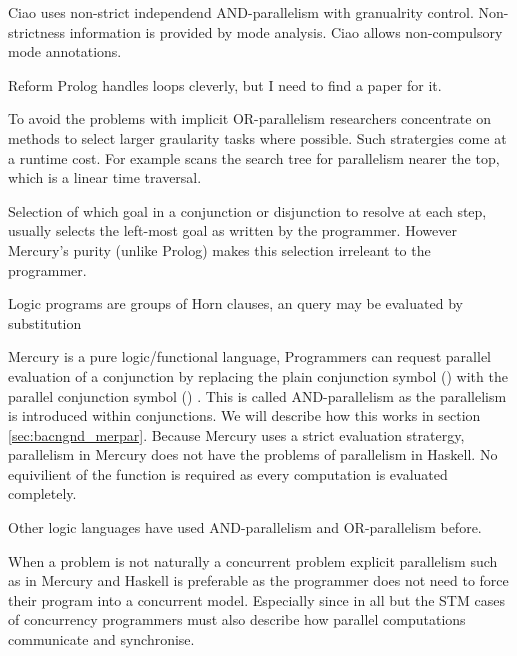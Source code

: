 Ciao uses non-strict independend AND-parallelism with granualrity control.
Non-strictness information is provided by mode analysis.
Ciao allows non-compulsory mode annotations.

Reform Prolog handles loops cleverly, but I need to find a paper for it.


To avoid the problems with implicit OR-parallelism researchers concentrate
on methods to select larger graularity tasks where possible.
Such stratergies come at a runtime cost.
For example \citet{hausman:1987:or} scans the search tree for parallelism
nearer the top, which is a linear time traversal.

Selection of which goal in a conjunction or disjunction to resolve at each
step,
usually selects the left-most goal as written by the programmer.
However Mercury's purity (unlike Prolog) makes this selection irreleant to
the programmer.


Logic programs are groups of Horn clauses,
an query may be evaluated by substitution  




\label{ref:parallel_conjunction}
Mercury is a pure logic/functional language,
Programmers can request parallel evaluation of a conjunction by replacing
the plain conjunction symbol (\samp{,})
with the parallel conjunction symbol (\samp{\&})
\citep{conway:2002:par,wang:2006:hons,wang:2011:dep-par}.
This is called AND-parallelism as the parallelism is introduced within
conjunctions.
We will describe how this works in section \ref{sec:bacngnd_merpar}.
Because Mercury uses a strict evaluation stratergy,
parallelism in Mercury does not have the problems of parallelism in Haskell.
No equivilient of the  function is required as every computation
is evaluated completely.

Other logic languages have used AND-parallelism and OR-parallelism before.


When a problem is not naturally a concurrent problem 
explicit parallelism such as in Mercury and Haskell
is preferable as the programmer does not need to force their program
into a concurrent model.
Especially since in all but the STM cases of concurrency programmers
must also describe how parallel computations communicate and
synchronise.

